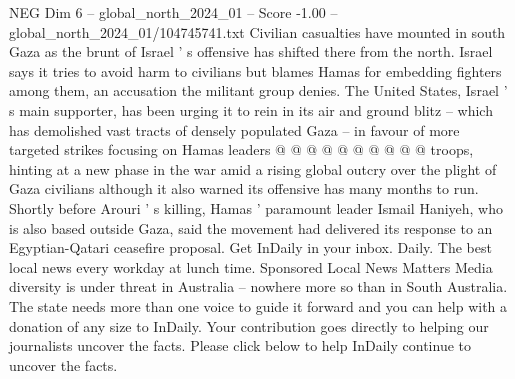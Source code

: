 \begin{textsample}{NEG Dim 6 – global\_north\_2024\_01 – Score -1.00 – global\_north\_2024\_01/104745741.txt}
Civilian casualties have mounted in south Gaza as the brunt of Israel ' s offensive has shifted there from the north.
Israel says it tries to avoid harm to civilians but blames Hamas for embedding fighters among them, an accusation the militant group denies.
The United States, Israel ' s main supporter, has been urging it to rein in its air and ground blitz -- which has demolished vast tracts of densely populated Gaza -- in favour of more targeted strikes focusing on Hamas leaders @ @ @ @ @ @ @ @ @ @ troops, hinting at a new phase in the war amid a rising global outcry over the plight of Gaza civilians although it also warned its offensive has many months to run.
Shortly before Arouri ' s killing, Hamas ' paramount leader Ismail Haniyeh, who is also based outside Gaza, said the movement had delivered its response to an Egyptian-Qatari ceasefire proposal.
Get InDaily in your inbox.
Daily.
The best local news every workday at lunch time.
Sponsored Local News Matters Media diversity is under threat in Australia -- nowhere more so than in South Australia.
The state needs more than one voice to guide it forward and you can help with a donation of any size to InDaily.
Your contribution goes directly to helping our journalists uncover the facts.
Please click below to help InDaily continue to uncover the facts.

\end{textsample}

